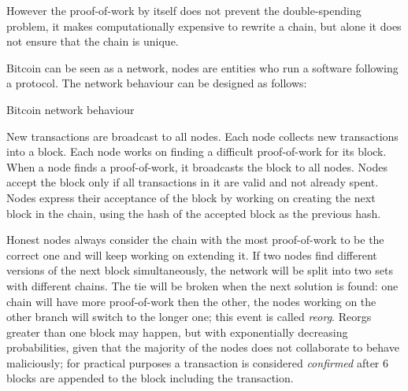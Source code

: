 However the proof-of-work by itself does not prevent the double-spending problem, it makes computationally expensive to rewrite a chain, but alone it does not ensure that the chain is unique.

Bitcoin can be seen as a network, nodes are entities who run a software following a protocol. The network behaviour can be designed as follows:

\begin{algorithm}
	\caption{Bitcoin network behaviour}
	\begin{algorithmic}[1]
		\State New transactions are broadcast to all nodes.
		\State Each node collects new transactions into a block.
		\State Each node works on finding a difficult proof-of-work for its block.
		\State When a node finds a proof-of-work, it broadcasts the block to all nodes.
		\State Nodes accept the block only if all transactions in it are valid and not already spent.
		\State  Nodes express their acceptance of the block by working on creating the next block in the chain, using the hash of the accepted block as the previous hash. %
	\end{algorithmic}
\end{algorithm}  

Honest nodes always consider the chain with the most proof-of-work to be the correct one and will keep working on extending it.
If two nodes find different versions of the next block simultaneously, the network will be split into two sets with different chains. 
The tie will be broken when the next solution is found: one chain will have more proof-of-work then the other, the nodes working on the other branch will switch to the longer one; this event is called \textit{reorg}. 
Reorgs greater than one block may happen, but with exponentially decreasing probabilities, given that the majority of the nodes does not collaborate to behave maliciously; for practical purposes a transaction is considered \textit{confirmed} after 6 blocks are appended to the block including the transaction.

